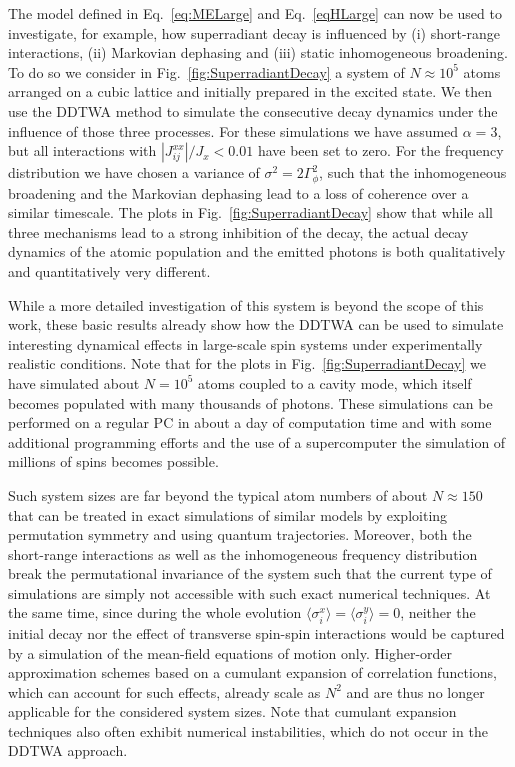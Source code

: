 \documentclass[pra,twocolumn,showpacs,preprintnumbers,amsmath,amssymb,superscriptaddress]{revtex4-1}
\begin{document}
The model defined in Eq.~\eqref{eq:MELarge} and Eq.~\eqref{eqHLarge} can now be used to investigate, for example, how superradiant decay is influenced by (i) short-range interactions, (ii) Markovian dephasing and (iii) static inhomogeneous broadening. To do so we consider in Fig.~\ref{fig:SuperradiantDecay} a system of $N\approx 10^5$ atoms arranged on a cubic lattice and initially prepared in the excited state. We then use the DDTWA method to simulate the consecutive decay dynamics under the influence of those three processes. For these simulations we have assumed $\alpha=3$, but all interactions with $|J^{xx}_{ij}|/J_x<0.01$ have been set to zero. For the frequency distribution we have chosen a variance of $\sigma^2=2\Gamma_\phi^2$, such that the inhomogeneous broadening and the Markovian dephasing lead to a loss of coherence over a similar timescale. The plots in Fig.~\ref{fig:SuperradiantDecay} show that while all three mechanisms lead to a strong inhibition of the decay, the actual decay dynamics of the atomic population and the emitted photons is both qualitatively and quantitatively very different.  


While a more detailed investigation of this system is beyond the scope of this work, these basic results already show how the DDTWA can be used to simulate interesting dynamical effects in large-scale spin systems under experimentally realistic conditions. Note that for the plots in Fig.~\ref{fig:SuperradiantDecay} we have simulated about $N=10^5$ atoms coupled to a cavity mode, which itself becomes populated with many thousands of photons. These simulations can be performed on a regular PC in about a day of computation time and with some additional programming efforts and the use of a supercomputer the simulation of millions of spins becomes possible.


Such system sizes are far beyond the typical atom numbers of about  $N\approx 150$~\cite{Kirton2017} that can be treated in exact simulations of similar models by exploiting permutation symmetry and using quantum trajectories. Moreover, both the short-range interactions as well as the inhomogeneous frequency distribution break the permutational invariance of the system such that the current type of simulations are simply not accessible with such exact numerical techniques. At the same time, since during the whole evolution $\langle \sigma^x_i\rangle=\langle \sigma^y_i\rangle=0$, neither the initial decay nor the effect of transverse spin-spin interactions would be captured by a simulation of the mean-field equations of motion only.  
Higher-order approximation schemes based on a cumulant expansion of correlation functions, which can account for such effects, already scale as $N^2$ and are thus no longer applicable for the considered system sizes. Note that cumulant expansion techniques also often exhibit numerical instabilities, which do not occur  in the DDTWA approach.
\end{document}

